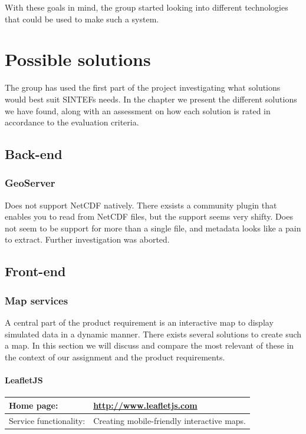 \documentclass[11pt,a4paper,titlepage,oneside]{report}
\begin{document}
With these goals in mind, the group started looking into different technologies that could be used to make such a system.

\chapter{Possible solutions}
The group has used the first part of the project investigating what solutions would best suit SINTEFs needs. In the chapter we present the different solutions we have found, along with an assessment on how each solution is rated in accordance to the evaluation criteria. 

\section{Back-end}
\subsection{GeoServer}

Does not support NetCDF natively. There exsists a community plugin that enables you to read from NetCDF files, but the support seems very shifty. Does not seem to be support for more than a single file, and metadata looks like a pain to extract. Further investigation was aborted.

\section{Front-end}

  \subsection{Map services}

  A central part of the product requirement is an interactive map to display simulated data in a dynamic manner. There exists several solutions to create such a map. In this section we will discuss and compare the most relevant of these in the context of our assignment and the product requirements.

  \subsubsection{LeafletJS}
  \begin{tabular}{|p{4cm}|p{8cm}|}
    \hline
    Home page: & \url{http://www.leafletjs.com} \\
    \hline
    Service functionality: & Creating mobile-friendly interactive maps. \\
    \hline
  \end{tabular}
  
\end{document}
